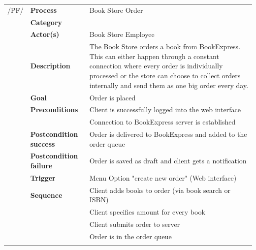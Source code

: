 \documentclass[11pt,a4paper,oneside,svgnames]{report}
\begin{document}
\noindent
\begin{tabular}{p{1.5cm}p{3cm}p{8cm}}
/PF/	& \textbf{Process} & Book Store Order\\ 
		& \textbf{Category} & \\
		& \textbf{Actor(s)} & Book Store Employee\\ 
		& \textbf{Description}	 & The Book Store orders a book from BookExpress.
This can either happen through a constant connection where every order is individually processed or the store can choose to collect orders internally and send them
as one big order every day.\\ 
		& \textbf{Goal} & Order is placed\\
		& \textbf{Preconditions} & Client is successfully logged into the web interface\\
		& & Connection to BookExpress server is established\\
		& \textbf{Postcondition success} & Order is delivered to BookExpress  and added to the order queue\\
		& \textbf{Postcondition failure} & Order is saved as draft and client gets a notification\\
		& \textbf{Trigger} & Menu Option "create new order" (Web interface)\\
		& \textbf{Sequence} & Client adds books to order (via book search or ISBN)\\
		& & Client specifies amount for every book\\
		& & Client submits order to server\\
		& & Order is in the order queue\\
\hfill \\
\end{tabular}
\end{document}
